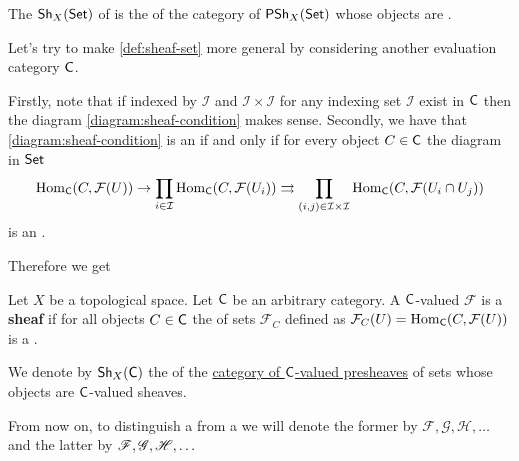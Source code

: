 \documentclass[../main.tex]{subfiles}
\begin{document}
\begin{definition} \label{def:sheaf-set-category}
The  \(\mathsf{Sh}_{X}(\mathsf{Set})\) of  is the  of the category of  \(\mathsf{PSh}_{X}(\mathsf{Set})\) whose objects are .
\end{definition}

Let's try to make \autoref{def:sheaf-set} more general by considering another evaluation category \(\mathsf{C}\).

Firstly, note that if  indexed by \(\mathcal{I}\) and \(\mathcal{I} \times \mathcal{I}\) for any indexing set \(\mathcal{I}\) exist in \(\mathsf{C}\) then the diagram \eqref{diagram:sheaf-condition} makes sense.
Secondly, we have that \eqref{diagram:sheaf-condition} is an  if and only if for every object \(C \in \mathsf{C}\) the diagram in \(\mathsf{Set}\)
\begin{equation*}
  \operatorname{Hom}_{\mathsf{C}}(C, \mathcal{F}(U)) \to \prod_{i \in \mathcal{I}} \operatorname{Hom}_{\mathsf{C}}(C, \mathcal{F}(U_{i})) \rightrightarrows \prod_{(i, j) \in \mathcal{I} \times \mathcal{I}} \operatorname{Hom}_{\mathsf{C}}(C, \mathcal{F}(U_{i} \cap U_{j}))
\end{equation*}
is an .

Therefore we get
\begin{definition}[Sheaf] \label{def:sheaf}
  Let \(X\) be a topological space.
  Let \(\mathsf{C}\) be an arbitrary category.
  A \(\mathsf{C}\)-valued  \(\mathcal{F}\) is a \textbf{sheaf} if for all objects \(C \in \mathsf{C}\) the  of sets \(\mathcal{F}_{C}\) defined as \(\mathcal{F}_{C}(U) = \operatorname{Hom}_{\mathsf{C}}(C, \mathcal{F}(U))\) is a .

  We denote by \(\mathsf{Sh}_{X}(\mathsf{C})\) the  of the \hyperref[def:presheaf]{category of \(\mathsf{C}\)-valued presheaves} of sets whose objects are \(\mathsf{C}\)-valued sheaves.
\end{definition}

\begin{notation}
  From now on, to distinguish a  from a  we will denote the former by \(\mathcal{F}, \mathcal{G}, \mathcal{H}, \ldots\) and the latter by \(\mathscr{F}, \mathscr{G}, \mathscr{H}, \ldots\)
\end{notation}
\end{document}
